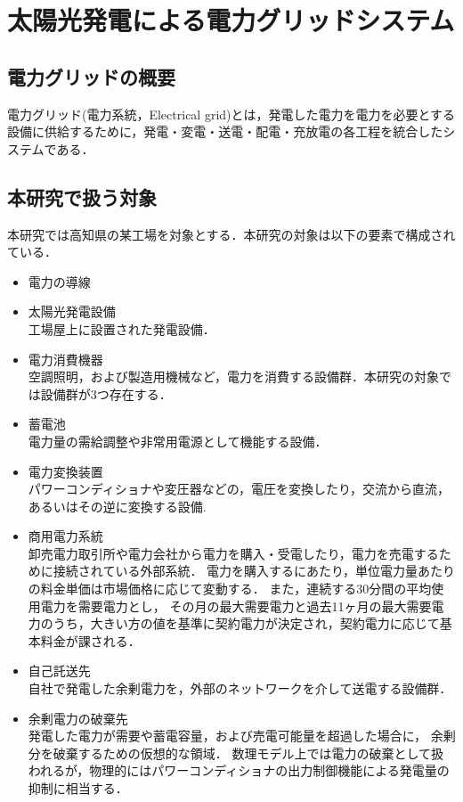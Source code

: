 
\chapter{太陽光発電による電力グリッドシステム}
\section{電力グリッドの概要}
電力グリッド(電力系統，Electrical grid)とは，発電した電力を電力を必要とする設備に供給するために，発電・変電・送電・配電・充放電の各工程を統合したシステムである．

\section{本研究で扱う対象}
本研究では高知県の某工場を対象とする．本研究の対象は以下の要素で構成されている．
\begin{itemize}
	\item 電力の導線
	\item 太陽光発電設備\\
	工場屋上に設置された発電設備．
	\item 電力消費機器\\
	空調照明，および製造用機械など，電力を消費する設備群．本研究の対象では設備群が3つ存在する．
	\item 蓄電池\\
	電力量の需給調整や非常用電源として機能する設備．
	\item 電力変換装置\\
	パワーコンディショナや変圧器などの，電圧を変換したり，交流から直流，あるいはその逆に変換する設備.
	\item 商用電力系統\\
	卸売電力取引所や電力会社から電力を購入・受電したり，電力を売電するために接続されている外部系統． 
	電力を購入するにあたり，単位電力量あたりの料金単価は市場価格に応じて変動する． 
	また，連続する30分間の平均使用電力を需要電力とし，
	その月の最大需要電力と過去11ヶ月の最大需要電力のうち，大きい方の値を基準に契約電力が決定され，契約電力に応じて基本料金が課される．\cite{m}
	\item 自己託送先\\
	自社で発電した余剰電力を，外部のネットワークを介して送電する設備群．
	\item 余剰電力の破棄先\\
	発電した電力が需要や蓄電容量，および売電可能量を超過した場合に，
	余剰分を破棄するための仮想的な領域．
	数理モデル上では電力の破棄として扱われるが，物理的にはパワーコンディショナの出力制御機能による発電量の抑制に相当する．	
\end{itemize}
	
